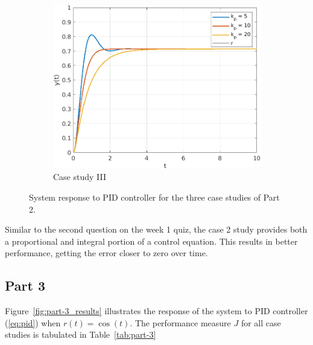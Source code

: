 \documentclass{article}
\begin{document}
\begin{figure}[H]
\begin{subfigure}{0.325\textwidth}
        \centering
        \includegraphics[width = \textwidth]{figures/part_2_kd.png}
        \caption{Case study III}
    \end{subfigure}
    \caption{System response to PID controller for the three case studies of Part 2.}
    \label{fig:part-2_results}
\end{figure}

Similar to the second question on the week 1 quiz, the case 2 study provides both a proportional and integral portion of a control equation. This results in better performance, getting the error closer to zero over time.

\subsection*{Part 3}

Figure~\ref{fig:part-3_results} illustrates the response of the system to PID controller (\ref{eq:pid}) when $r(t) = \cos(t)$. The performance measure $J$ for all case studies is tabulated in Table~\ref{tab:part-3}
\end{document}
